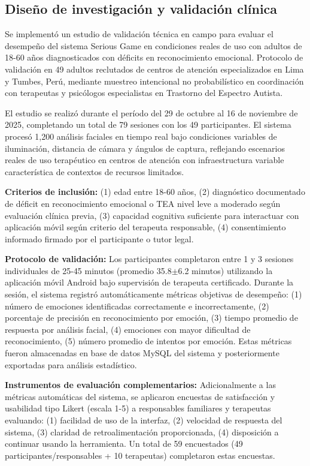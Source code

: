 \documentclass[journal,article,submit,pdftex,moreauthors]{Definitions/mdpi}
\begin{document}
	\subsection{Diseño de investigación y validación clínica}
	
	Se implementó un estudio de validación técnica en campo para evaluar el desempeño del sistema Serious Game en condiciones reales de uso con adultos de 18-60 años diagnosticados con déficits en reconocimiento emocional. Protocolo de validación en 49 adultos reclutados de centros de atención especializados en Lima y Tumbes, Perú, mediante muestreo intencional no probabilístico en coordinación con terapeutas y psicólogos especialistas en Trastorno del Espectro Autista.
	
	El estudio se realizó durante el período del 29 de octubre al 16 de noviembre de 2025, completando un total de 79 sesiones con los 49 participantes. El sistema procesó 1,200 análisis faciales en tiempo real bajo condiciones variables de iluminación, distancia de cámara y ángulos de captura, reflejando escenarios reales de uso terapéutico en centros de atención con infraestructura variable característica de contextos de recursos limitados.
	
	\textbf{Criterios de inclusión:} (1) edad entre 18-60 años, (2) diagnóstico documentado de déficit en reconocimiento emocional o TEA nivel leve a moderado según evaluación clínica previa, (3) capacidad cognitiva suficiente para interactuar con aplicación móvil según criterio del terapeuta responsable, (4) consentimiento informado firmado por el participante o tutor legal.
	
	\textbf{Protocolo de validación:} Los participantes completaron entre 1 y 3 sesiones individuales de 25-45 minutos (promedio 35.8$\pm$6.2 minutos) utilizando la aplicación móvil Android bajo supervisión de terapeuta certificado. Durante la sesión, el sistema registró automáticamente métricas objetivas de desempeño: (1) número de emociones identificadas correctamente e incorrectamente, (2) porcentaje de precisión en reconocimiento por emoción, (3) tiempo promedio de respuesta por análisis facial, (4) emociones con mayor dificultad de reconocimiento, (5) número promedio de intentos por emoción. Estas métricas fueron almacenadas en base de datos MySQL del sistema y posteriormente exportadas para análisis estadístico.
	
	\textbf{Instrumentos de evaluación complementarios:} Adicionalmente a las métricas automáticas del sistema, se aplicaron encuestas de satisfacción y usabilidad tipo Likert (escala 1-5) a responsables familiares y terapeutas evaluando: (1) facilidad de uso de la interfaz, (2) velocidad de respuesta del sistema, (3) claridad de retroalimentación proporcionada, (4) disposición a continuar usando la herramienta. Un total de 59 encuestados (49 participantes/responsables + 10 terapeutas) completaron estas encuestas.
	
\end{document}
